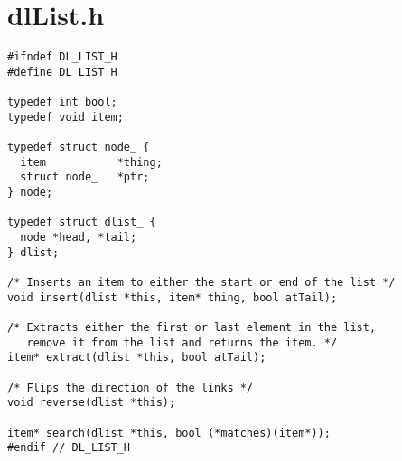 \documentclass[a4paper,12pt]{article}
\begin{document}
\section*{dlList.h}
\begin{lstlisting}
#ifndef DL_LIST_H
#define DL_LIST_H

typedef int bool;
typedef void item;

typedef struct node_ {
  item           *thing;
  struct node_   *ptr;
} node;

typedef struct dlist_ {
  node *head, *tail;
} dlist;

/* Inserts an item to either the start or end of the list */
void insert(dlist *this, item* thing, bool atTail);

/* Extracts either the first or last element in the list, 
   remove it from the list and returns the item. */
item* extract(dlist *this, bool atTail);

/* Flips the direction of the links */
void reverse(dlist *this);

item* search(dlist *this, bool (*matches)(item*));
#endif // DL_LIST_H
\end{lstlisting}
\newpage
\end{document}
